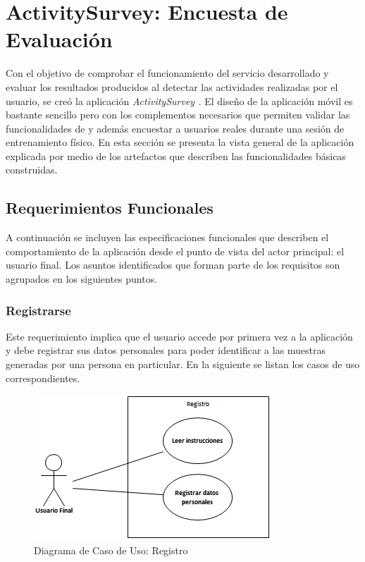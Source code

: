 \section{ActivitySurvey: Encuesta de Evaluación}

\label{sec55:activity}Con el objetivo de comprobar el funcionamiento
del servicio \emph{} desarrollado y evaluar los resultados
producidos al detectar las actividades realizadas por el usuario,
se creó la aplicación \emph{ActivitySurvey \cite{GimenezYegros2016e}.
}El diseño de la aplicación móvil es bastante sencillo pero con los
complementos necesarios que permiten validar las funcionalidades de
\emph{} y además encuestar a usuarios reales durante
una sesión de entrenamiento físico. En esta sección se presenta la
vista general de la aplicación explicada por medio de los artefactos
que describen las funcionalidades básicas construidas. 

\subsection{Requerimientos Funcionales}

A continuación se incluyen las especificaciones funcionales que describen
el comportamiento de la aplicación desde el punto de vista del actor
principal: el usuario final. Los asuntos identificados que forman
parte de los requisitos son agrupados en los siguientes puntos.

\subsubsection{Registrarse}

Este requerimiento implica que el usuario accede por primera vez a
la aplicación y debe registrar sus datos personales para poder identificar
a las muestras generadas por una persona en particular. En la siguiente
 se listan los casos de uso correspondientes.

\begin{figure}[H]
\begin{centering}
\includegraphics{capitulo-5/graphics/caso_registro}
\par\end{centering}
\caption[Diagrama de Caso de Uso: Registro]{\label{fig5:uc-registro}Diagrama de Caso de Uso: Registro}
\end{figure}

